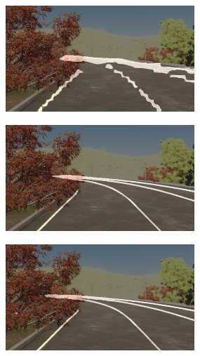         
        \begin{figure}[h]
       \caption{Qualitative results for binary lane segmentation trained on sim3d dataset for all the lanes present in the scene: (a) SCNN(Res18+Focal Loss) (b) RESA(Res18+Dice Loss) (c)RESA(Res18+Focal Loss)}
        \centering
        \begin{subfigure}{0.4\textwidth}
        \includegraphics[width=1\linewidth, height=4cm]{images/full_res18_scnn_focal.png} 
        \caption{}
        \label{fig:subim1}
        \end{subfigure}
        \begin{subfigure}{0.4\textwidth}
        \includegraphics[width=1\linewidth,height=4cm]{images/Resa_r18_full_dice.png}
        \caption{}
        \label{fig:subim2}
        \end{subfigure}
        \begin{subfigure}{0.4\textwidth}
        \includegraphics[width=1\linewidth, height=4cm]{images/Resa_r50_full_dice.png}
        \caption{}
        \label{fig:subim2}
        \end{subfigure}
        \label{fig:image2}
        \end{figure}
        
    
    
